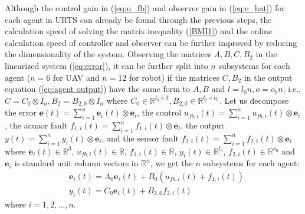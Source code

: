 \documentclass{ieeeaccess}
\begin{document}

Although the control gain in (\ref{eq:u_fb}) and observer gain in (\ref{eq:e_hat}) for each agent in URTS can already be found through the previous steps, the calculation speed of solving the matrix inequality (\ref{BMI1}) and the online calculation speed of controller and observer can be further improved by reducing the dimensionality of the system. Observing the matrices $A,B,C,B_2$ in the linearized system (\ref{eq:error}), it can be further split into $n$ subsystems for each agent ($n=6$ for UAV and $n=12$ for robot) if the matrices $C,B_2$ in the output equation (\ref{eq:agent output}) have the same form to $A,B$ and $l=l_0n, o=o_0n$, i.e., $C = C_0\otimes I_n,B_2 = B_{2,0}\otimes I_n$ where $C_0\in\mathbb{R}^{l_0\times 3},B_{2,0}\in\mathbb{R}^{l_0\times o_0}$. Let us decompose 
the error $\pmb{e}(t)=\sum_{i=1}^{n} \pmb{e}_i(t)\otimes\mathbf{e}_i$, 
the control $u_{fb,i}(t)=\sum_{i=1}^{n} {u}_{fb,i}(t)\otimes\mathbf{e}_i$, 
the acuaor fault $f_{1,i}(t)=\sum_{i=1}^{n} {f}_{1,i}(t)\otimes\mathbf{e}_i$, 
the output $y(t)=\sum_{i=1}^{n} {y}_i(t)\otimes\mathbf{e}_i$, 
and the sensor fault $f_{2,i}(t)=\sum_{i=1}^{n} {f}_{2,i}(t)\otimes\mathbf{e}_i$ 
where $\pmb{e}_i(t)\in\mathbb{R}^3$, $u_{fb,i}(t)\in\mathbb{R}$, $f_{1,i}(t)\in\mathbb{R}$, $y_i(t)\in\mathbb{R}^{l_0}$, $f_{2,i}(t)\in\mathbb{R}^{o_0}$ and $\mathbf{e}_i$ is standard unit column vectors in $\mathbb{R}^n$, we get the $n$ subsystems for each agent:
\begin{equation} \label{eq:linear subsys}
    \begin{split}
        & \dot{\pmb{e}}_i(t)=A_0\pmb{e}_i(t)+B_0(u_{fb,i}(t)+f_{1,i}(t)) \\
        & {y}_i(t)=C_0\pmb{e}_i(t)+B_{2,0}f_{2,i}(t)   
    \end{split}
\end{equation} where $i=1,2,...,n$.
\end{document}
